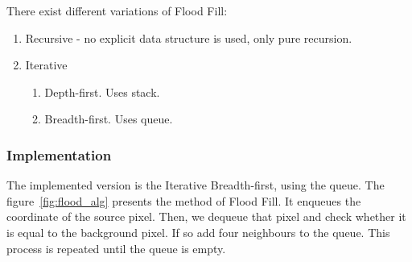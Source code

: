 \documentclass{article}
\begin{document}

There exist different variations of Flood Fill:
\begin{enumerate}
	\item Recursive - no explicit data structure is used, only pure recursion.
 	\item Iterative
 	\begin{enumerate}
	 	\item Depth-first. Uses stack.
	 	\item Breadth-first. Uses queue.
 	\end{enumerate}
\end{enumerate}

\subsubsection{Implementation}

The implemented version is the Iterative Breadth-first, using the queue. The figure~\ref{fig:flood_alg} presents the method of Flood Fill. It enqueues the coordinate of the source pixel. Then, we dequeue that pixel and check whether it is equal to the background pixel. If so add four neighbours to the queue. This process is repeated until the queue is empty.
\end{document}
